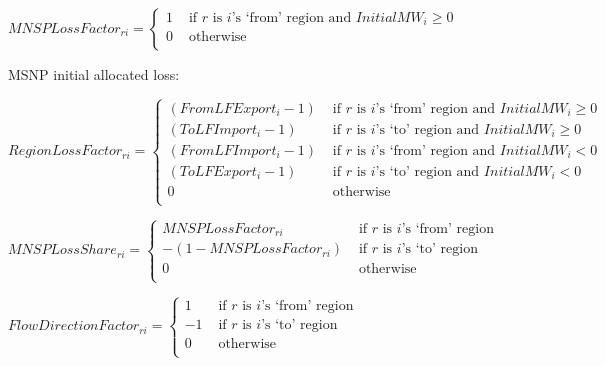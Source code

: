 \documentclass{article}
\begin{document}
$MNSPLossFactor_{ri}=
\begin{cases}
1 &\textrm{ if $r$ is $i$'s `from' region and $InitialMW_{i} \geq 0$} \\
0 &\textrm{ otherwise} \\
\end{cases}$

MSNP initial allocated loss:







$RegionLossFactor_{ri} =
\begin{cases}
(FromLFExport_{i} - 1) & \textrm{ if $r$ is $i$'s `from' region and $InitialMW_{i} \geq 0$} \\
(ToLFImport_{i} - 1) &\textrm{ if $r$ is $i$'s `to' region and $InitialMW_{i} \geq 0$}\\
(FromLFImport_{i} - 1) &\textrm{ if $r$ is $i$'s `from' region and $InitialMW_{i} < 0$}\\
(ToLFExport_{i} - 1) &\textrm{ if $r$ is $i$'s `to' region and $InitialMW_{i} < 0$}\\
0 & \textrm{ otherwise}\\
\end{cases}$

$MNSPLossShare_{ri}=
\begin{cases}
MNSPLossFactor_{ri} & \textrm{ if $r$ is $i$'s `from' region} \\
- (1 - MNSPLossFactor_{ri}) &\textrm{ if $r$ is $i$'s `to' region}\\
0 & \textrm{ otherwise}\\
\end{cases}$

$FlowDirectionFactor_{ri}=
\begin{cases}
1 & \textrm{ if $r$ is $i$'s `from' region} \\
- 1 &\textrm{ if $r$ is $i$'s `to' region}\\
0 & \textrm{ otherwise}\\
\end{cases}$
\end{document}
